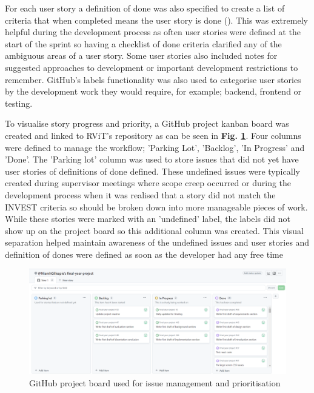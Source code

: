 \documentclass[l4proj.tex]{subfiles}
\begin{document}
For each user story a definition of done was also specified to create a list of criteria that when completed means the user story is done (\cite{Silva2017}). This was extremely helpful during the development process as often user stories were defined at the start of the sprint so having a checklist of done criteria clarified any of the ambiguous areas of a user story. Some user stories also included notes for suggested approaches to development or important development restrictions to remember. GitHub's labels functionality was also used to categorise user stories by the development work they would require, for example; backend, frontend or testing. 

To visualise story progress and priority, a GitHub project kanban board was created and linked to RViT's repository as can be seen in \textbf{Fig. \ref{fig:My Github issue board}}. Four columns were defined to manage the workflow; 'Parking Lot', 'Backlog', 'In Progress' and 'Done'. The 'Parking lot' column was used to store issues that did not yet have user stories of definitions of done defined. These undefined issues were typically created during supervisor meetings where scope creep occurred or during the development process when it was realised that a story did not match the INVEST criteria so should be broken down into more manageable pieces of work. While these stories were marked with an 'undefined' label, the labels did not show up on the project board so this additional column was created. This visual separation helped maintain awareness of the undefined issues and user stories and definition of dones were defined as soon as the developer had any free time

\begin{figure}[h!]
\begin{center}
\includegraphics[scale=0.4]{dissertation/images/ImplementationIssueBoard.png}
\caption{GitHub project board used for issue management and prioritisation}
\label{fig:My Github issue board} 
\end{center}
\end{figure}
\end{document}
